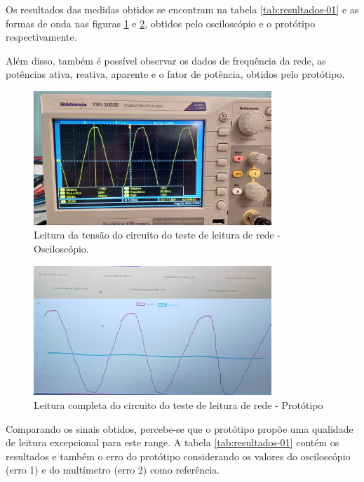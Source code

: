 Os resultados das medidas obtidos se encontram na tabela \autoref{tab:resultados-01} e as formas de onda nas figuras \ref{fig:leitura-rede-osc} e \ref{fig:leitura-rede-boy-ondas}, obtidos pelo osciloscópio e o protótipo respectivamente. 

Além disso, também é possível observar os dados de frequência da rede, as potências ativa, reativa, aparente e o fator de potência, obtidos pelo protótipo.

\begin{figure}[htb!]
    \caption{Leitura da tensão do circuito do teste de leitura de rede - Osciloscópio.}
    \label{fig:leitura-rede-osc}
    \includegraphics[width=0.8\textwidth]{figuras/leitura-rede-osc.png}
    \fonte{}
\end{figure}

\begin{figure}[htb!]
    \caption{Leitura completa do circuito do teste de leitura de rede - Protótipo}
    \label{fig:leitura-rede-boy-ondas}
    \includegraphics[width=0.8\textwidth]{figuras/leitura-rede-boy-ondas.png}
    \fonte{}
\end{figure}

Comparando os sinais obtidos, percebe-se que o protótipo propõe uma qualidade de leitura excepcional para este range. A tabela \autoref{tab:resultados-01} contém os resultados e também o erro do protótipo considerando os valores do osciloscópio (erro 1) e do multímetro (erro 2) como referência.

